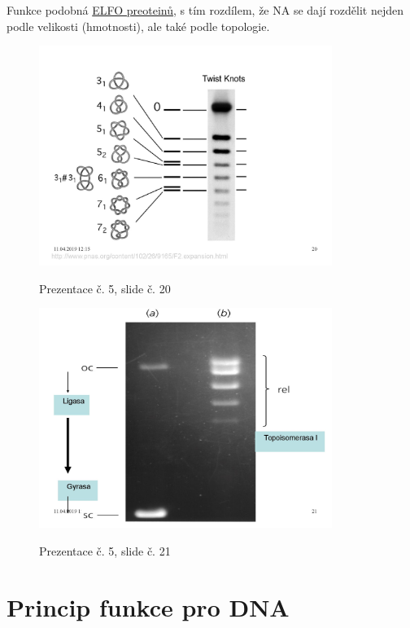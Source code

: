 \documentclass[DIV=8]{scrreprt}
\begin{document}
Funkce podobná \hyperref[Gelová elektroforéza]{ELFO preoteinů}, s tím rozdílem, že NA se dají rozdělit nejden podle velikosti (hmotnosti), ale také podle topologie. \begin{figure}
    \caption{Prezentace č. 5, slide č. 20}
    \includegraphics[width=0.85\textwidth]{slides-5/slide-20.jpg}
    \centering
    \label{slides-5-slide-20}
\end{figure}
\begin{figure}
    \caption{Prezentace č. 5, slide č. 21}
    \includegraphics[width=0.85\textwidth]{slides-5/slide-21.jpg}
    \centering
    \label{slides-5-slide-21}
\end{figure}


\section{Princip funkce pro DNA} \label{Princip funkce pro DNA}
\end{document}

